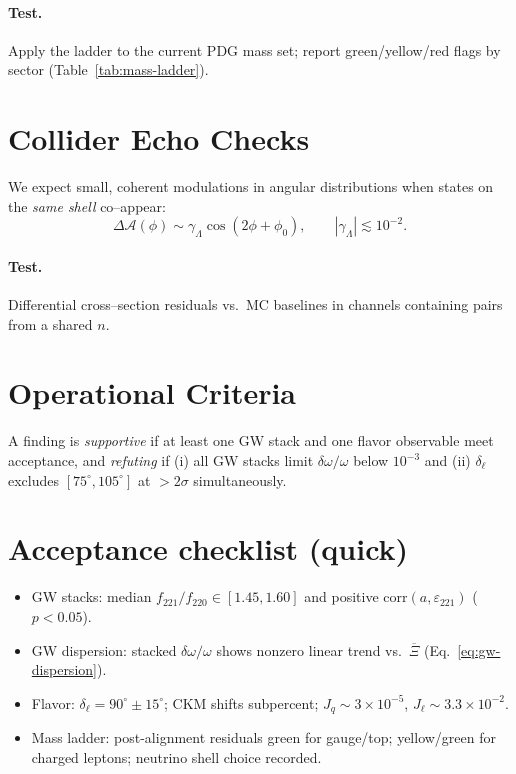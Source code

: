 \paragraph{Test.} Apply the ladder to the current PDG mass set; report green/yellow/red flags by sector (Table~\ref{tab:mass-ladder}).

\section{Collider Echo Checks}
We expect small, coherent modulations in angular distributions when states on the \emph{same shell} co–appear:
\begin{equation}
\Delta\mathcal{A}(\phi)\sim \gamma_\Lambda \cos(2\phi+\phi_0),\qquad |\gamma_\Lambda|\lesssim 10^{-2}.
\end{equation}
\paragraph{Test.} Differential cross–section residuals vs.\ MC baselines in channels containing pairs from a shared \(n\).

\section{Operational Criteria}
A finding is \emph{supportive} if at least one GW stack and one flavor observable meet acceptance, and \emph{refuting} if
(i) all GW stacks limit \(\delta\omega/\omega\) below \(10^{-3}\) and 
(ii) \(\delta_\ell\) excludes \([75^\circ,105^\circ]\) at \(>2\sigma\) simultaneously.

\section*{Acceptance checklist (quick)}
\begin{itemize}
  \item GW stacks: median \(f_{221}/f_{220}\in[1.45,1.60]\) and positive \(\mathrm{corr}(a,\varepsilon_{221})\) (\(p<0.05\)).
  \item GW dispersion: stacked \(\delta\omega/\omega\) shows nonzero linear trend vs.\ \(\overline{\Xi}\) (Eq.~\eqref{eq:gw-dispersion}).
  \item Flavor: \(\delta_\ell=90^\circ\pm 15^\circ\); CKM shifts subpercent; \(J_q\sim 3\times10^{-5}\), \(J_\ell\sim 3.3\times10^{-2}\).
  \item Mass ladder: post-alignment residuals green for gauge/top; yellow/green for charged leptons; neutrino shell choice recorded.
\end{itemize}
